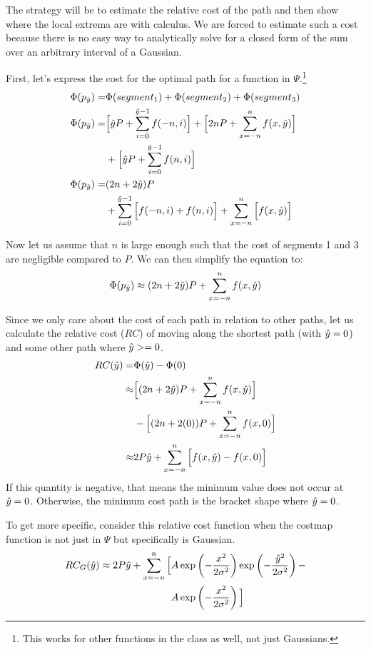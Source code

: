 The strategy will be to estimate the relative cost of the path and then show where the local extrema are with calculus. We are forced to estimate such a cost because there is no easy way to analytically solve for a closed form of the sum over an arbitrary interval of a Gaussian. 

First, let's express the cost for the optimal path for a function in $\Psi$.\footnote{This works for other functions in the class as well, not just Gaussians.}
\begin{align*}
\Phi(p_{\hat{y}}) =&\Phi(segment_1) + \Phi(segment_2) + \Phi(segment_3) \\
\Phi(p_{\hat{y}}) =&\Big[\hat{y} P + \sum\limits_{i=0}^{\hat{y}-1} f(-n, i) \Big] +
         \Big[2nP + \sum\limits_{x=-n}^{n}    f(x,\hat{y}) \Big]\\
     &+\Big[\hat{y} P + \sum\limits_{i=0}^{\hat{y}-1} f(n, i) \Big] \\
\Phi(p_{\hat{y}}) =&(2n+2\hat{y})P \\ &+\sum\limits_{i=0}^{\hat{y}-1} \Big[ f(-n, i) + f(n, i) \Big] + \sum\limits_{x=-n}^{n} \Big[f(x,\hat{y}) \Big]
\end{align*}

Now let us assume that $n$ is large enough such that the cost of segments 1 and 3 are negligible compared to $P$. We can then simplify the equation to:
\[
\Phi(p_{\hat{y}}) \approx (2n+2\hat{y})P +  \sum\limits_{x=-n}^{n} f(x,\hat{y})
\]

Since we only care about the cost of each path in relation to other paths, let us calculate the relative cost ($RC$) of moving along the shortest path (with $\hat{y}=0$) and some other path where $\hat{y}>=0$. 
\begin{align*}
RC(\hat{y}) =& \Phi(\hat{y})-\Phi(0) \\
\approx& \Big[(2n+2\hat{y})P +  \sum\limits_{x=-n}^{n} f(x,\hat{y}) \Big] \\
 & - \Big[(2n+2(0))P +  \sum\limits_{x=-n}^{n} f(x,0) \Big] \\
\approx& 2P\hat{y} + \sum\limits_{x=-n}^{n} \Big[ f(x,\hat{y})-f(x,0) \Big]
\end{align*}
If this quantity is negative, that means the minimum value does not occur at $\hat{y}=0$. Otherwise, the minimum cost path is the bracket shape where $\hat{y}=0$.

To get more specific, consider this relative cost function when the costmap function is not just in $\Psi$ but specifically is Gaussian. 
\begin{align*}
RC_G(\hat{y}) \approx 2P\hat{y} + \sum\limits_{x=-n}^{n} \Big[ &A\exp\left(-\frac{x^2}{2\sigma^2}\right)\exp\left(-\frac{\hat{y}^2}{2\sigma^2}\right) -\\
                                                           &A\exp\left(-\frac{x^2}{2\sigma^2}\right) \Big] 
\end{align*}

